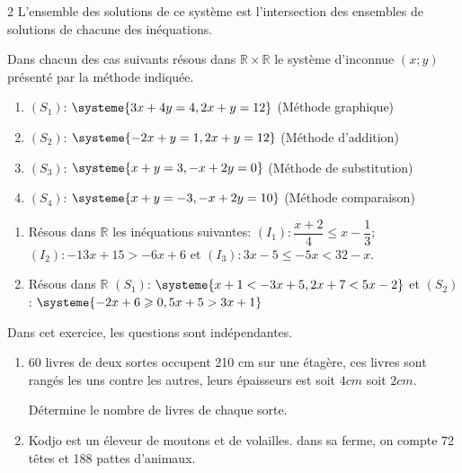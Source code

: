 \begin{multicols*}{2}
{  		L'ensemble des solutions de ce système est l'intersection des ensembles de solutions de chacune des inéquations.}
  	\begin{center}
  	\end{center}
  	\begin{center}
  	\end{center}
  	Dans chacun des cas suivants résous  dans $\mathbb{R}\times \mathbb{R}$ le système d'inconnue $(x;y)$ présenté par la méthode indiquée.
  	\begin{enumerate}
  		\item  $(S_{1})$: $\systeme{3x+4y=4 , 2x+y=12 }$ (Méthode graphique)
  		\item  $(S_{2})$: $\systeme{-2x+y=1 , 2x+y=12 }$ (Méthode d'addition)
  		\item  $(S_{3})$: $\systeme{x+y=3 , -x+2y=0 }$ (Méthode de substitution)
  		\item  $(S_{4})$: $\systeme{x+y=-3 , -x+2y=10 }$ (Méthode comparaison)
  	\end{enumerate}
  	\begin{center}
  	\end{center}
  	\begin{enumerate}
  		\item Résous dans $\mathbb{R}$ les inéquations suivantes:   $(I_{1}): \dfrac{x+2}{4}\leqslant x-\dfrac{1}{3}$; $(I_{2}): -13x+15>-6x+6$ et  $(I_{3}): 3x-5\leqslant -5x<32-x$.
  		\item Résous dans $\mathbb{R}$ $(S_{1})$: $\systeme{x+1<-3x+5 , 2x+7<5x-2 }$ et 
  		$(S_{2})$: $\systeme{-2x+6\geqslant 0 , 5x+5>3x+1 }$ 
  	\end{enumerate}
  	\begin{center}
  	\end{center}
  	Dans cet exercice, les questions sont indépendantes. 
  	\begin{enumerate}
  		\item $60$ livres de deux sortes occupent 210 cm sur une étagère, ces 
  		livres sont rangés les uns contre les autres, leurs épaisseurs est 
  		soit $4 cm$ soit $2 cm$. 
  		
  		Détermine le nombre de livres de chaque sorte.
  		\item  Kodjo est un éleveur de moutons et de volailles. dans sa ferme, on compte 72 têtes et 188 pattes d'animaux. 
  		

\end{enumerate}
\end{multicols*}
